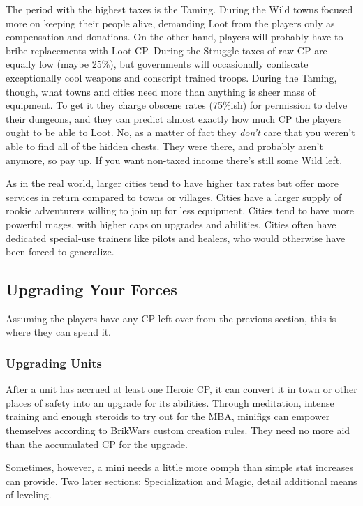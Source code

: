 \documentclass[12pt,a4paper,twocolumn]{article}
\begin{document}
The period with the highest taxes is the Taming.  During the Wild towns focused more on keeping their people alive, demanding Loot from the players only as compensation and donations.  On the other hand, players will probably have to bribe replacements with Loot CP.  During the Struggle taxes of raw CP are equally low (maybe 25\%), but governments will occasionally confiscate exceptionally cool weapons and conscript trained troops.  During the Taming, though, what towns and cities need more than anything is sheer mass of equipment.  To get it they charge obscene rates (75\%ish) for permission to delve their dungeons, and they can predict almost exactly how much CP the players ought to be able to Loot.  No, as a matter of fact they {\it don't} care that you weren't able to find all of the hidden chests.  They were there, and probably aren't anymore, so pay up.  If you want non-taxed income there's still some Wild left.

As in the real world, larger cities tend to have higher tax rates but offer more services in return compared to towns or villages.  Cities have a larger supply of rookie adventurers willing to join up for less equipment.  Cities tend to have more powerful mages, with higher caps on upgrades and abilities.  Cities often have dedicated special-use trainers like pilots and healers, who would otherwise have been forced to generalize.

\subsection{Upgrading Your Forces}

Assuming the players have any CP left over from the previous section, this is where they can spend it.

\subsubsection{Upgrading Units}

After a unit has accrued at least one Heroic CP, it can convert it in town or other places of safety into an upgrade for its abilities.  Through meditation, intense training and enough steroids to try out for the MBA, minifigs can empower themselves according to BrikWars custom creation rules.  They need no more aid than the accumulated CP for the upgrade. 

Sometimes, however, a mini needs a little more oomph than simple stat increases can provide.  Two later sections: Specialization and Magic, detail additional means of leveling.
\end{document}
